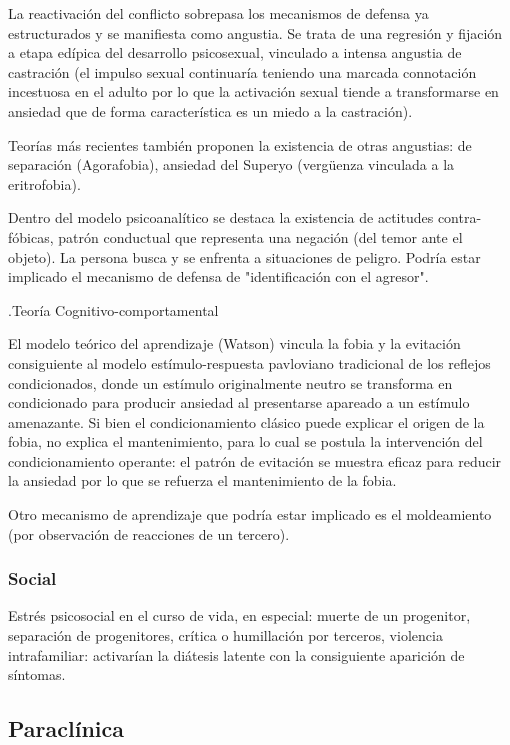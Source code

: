 La reactivación del conflicto sobrepasa los mecanismos de defensa ya estructurados y se manifiesta como angustia. Se trata de una regresión y fijación a etapa edípica del desarrollo psicosexual, vinculado a intensa angustia de castración (el impulso sexual continuaría teniendo una marcada connotación incestuosa en el adulto por lo que la activación sexual tiende a transformarse en ansiedad que de forma característica es un miedo a la castración).

Teorías más recientes también proponen la existencia de otras angustias: de separación (Agorafobia), ansiedad del Superyo (vergüenza vinculada a la eritrofobia).

Dentro del modelo psicoanalítico se destaca la existencia de actitudes contra-fóbicas, patrón conductual que representa una negación (del temor ante el objeto). La persona busca y se enfrenta a situaciones de peligro. Podría estar implicado el mecanismo de defensa de "identificación con el agresor".

.Teoría Cognitivo-comportamental

El modelo teórico del aprendizaje (Watson) vincula la fobia y la evitación consiguiente al modelo estímulo-respuesta pavloviano tradicional de los reflejos condicionados, donde un estímulo originalmente neutro se transforma en condicionado para producir ansiedad al presentarse apareado a un estímulo amenazante. Si bien el condicionamiento clásico puede explicar el origen de la fobia, no explica el mantenimiento, para lo cual se postula la intervención del condicionamiento operante: el patrón de evitación se muestra eficaz para reducir la ansiedad por lo que se refuerza el mantenimiento de la fobia.

Otro mecanismo de aprendizaje que podría estar implicado es el moldeamiento (por observación de reacciones de un tercero).

\subsubsection*{Social}

Estrés psicosocial en el curso de vida, en especial: muerte de un progenitor, separación de progenitores, crítica o humillación por terceros, violencia intrafamiliar: activarían la diátesis latente con la consiguiente aparición de síntomas.

\subsection*{Paraclínica}
